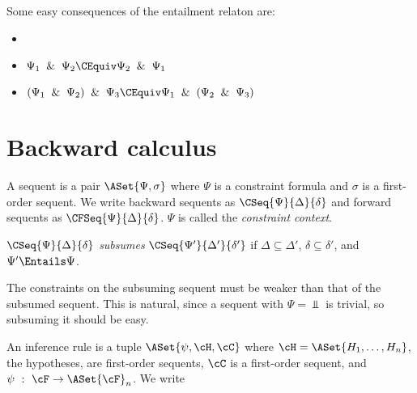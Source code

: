 \begin{theorem}
  Some easy consequences of the entailment relaton are:
  \begin{itemize}
  \item[]
  \item $\Psi_1\And\Psi_2 \CEquiv \Psi_2\And\Psi_1$
  \item $(\Psi_1\And\Psi_2)\And\Psi_3 \CEquiv \Psi_1\And(\Psi_2\And\Psi_3)$
  \end{itemize}
\end{theorem}

\section{Backward calculus}

\begin{definition}
  A sequent is a pair $\ASet{\Psi, \sigma}$
  where $\Psi$ is a constraint formula and $\sigma$ is a first-order sequent.
  We write backward sequents as $\CSeq{\Psi}{\Delta}{\delta}$ and
  forward sequents as $\CFSeq{\Psi}{\Delta}{\delta}$.
  $\Psi$ is called the \emph{constraint context}.
\end{definition}

\begin{definition}[Subsumption]
  $\CSeq{\Psi}{\Delta}{\delta}$ \emph{subsumes}
  $\CSeq{\Psi'}{\Delta'}{\delta'}$ if
  $\Delta \subseteq \Delta'$, $\delta \subseteq \delta'$, and $\Psi'\Entails\Psi$.
\end{definition}

\noindent
The constraints on the subsuming sequent must be weaker than that of the
subsumed sequent.  This is natural, since a sequent with $\Psi=\Bot$ is
trivial, so subsuming it should be easy.

\begin{definition}
  An inference rule is a tuple $\ASet{\psi, \cH, \cC}$ where
  $\cH = \ASet{H_1,\ldots,H_n}$, the hypotheses, are first-order sequents,
  $\cC$ is a first-order sequent, and $\psi~:~\cF\to\ASet{\cF}_n$.
  We write
\end{definition}


